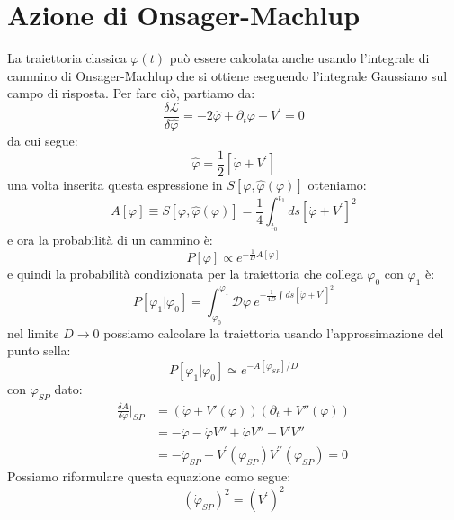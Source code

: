 \section{Azione di Onsager-Machlup}
La traiettoria classica $\varphi(t)$ può essere calcolata anche usando l'integrale di cammino di Onsager-Machlup che si ottiene eseguendo l'integrale Gaussiano sul campo di risposta.
Per fare ciò, partiamo da:
\begin{equation}
\frac{\delta\mathcal{L}}{\delta\hat{\varphi}}=-2\hat{\varphi}+\partial_{t}\varphi+V^{\prime}=0
\end{equation}
da cui segue:
\begin{equation}
\hat{\varphi}=\frac{1}{2}[\dot{\varphi}+V^{\prime}]
\end{equation}
una volta inserita questa espressione in $S[\varphi,\hat{\varphi}(\varphi)]$ otteniamo:
\begin{equation}
A[\varphi]\equiv S[\varphi,\hat{\varphi}(\varphi)]=\frac{1}{4}\int_{t_{0}}^{t_{1}}ds[\dot{\varphi}+V^{\prime}]^{2}
\end{equation}
e ora la probabilità di un cammino è:
\begin{equation}
P[\varphi]\propto e^{-\frac{1}{D}A[\varphi]}
\end{equation}
e quindi la probabilità condizionata per la traiettoria che collega $\varphi_{0}$ con $\varphi_{1}$ è:
\begin{equation}
P[\varphi_{1}|\varphi_{0}]=\int_{\varphi_{0}}^{\varphi_{1}}\mathcal{D}\varphi~e^{-\frac{1}{4D}\int ds[\dot{\varphi}+V^{\prime}]^{2}}
\end{equation}
nel limite $D \to 0$ possiamo calcolare la traiettoria usando l'approssimazione del punto sella:
\begin{equation}
P[\varphi_{1}|\varphi_{0}]\simeq e^{-A[\varphi_{SP}]/D}
\end{equation}
con $\varphi_{SP}$ dato:
\begin{align}
\frac{\delta A}{\delta\varphi}\Big|_{SP}&=(\dot{\varphi}+V'(\varphi))(\partial_t+V''(\varphi)) \nonumber \\
&= -\ddot{\varphi} - \dot{\varphi} V'' + \dot{\varphi} V'' + V'V''\nonumber \\
&=-\ddot{\varphi}_{SP}+V^{\prime}({\varphi}_{SP})V^{\prime\prime}({\varphi}_{SP})=0
\end{align}
Possiamo riformulare questa equazione como segue:
\begin{equation}
(\dot{\varphi}_{SP})^{2}=(V^{\prime})^{2}
\end{equation}

